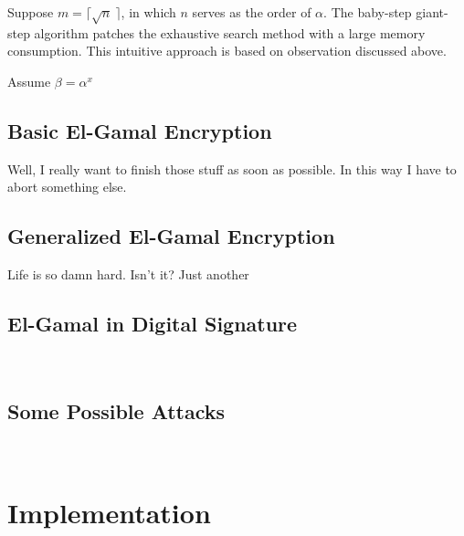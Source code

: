 \documentclass[12pt,journal,compsoc]{IEEEtran}
\begin{document}
Suppose $m=\lceil \sqrt{n}~\rceil$, in which $n$ serves as the order
of $\alpha$. The baby-step giant-step algorithm patches the exhaustive
search method with a large memory consumption. This intuitive approach
is based on observation discussed above.
\par
Assume $\beta=\alpha^{x}$











\subsection{Basic El-Gamal Encryption}
Well, I really want to finish those stuff as soon as possible. In this
way I have to abort something else.

\subsection{Generalized El-Gamal Encryption}
Life is so damn hard. Isn't it? Just another 

\subsection{El-Gamal in Digital Signature}
~

\subsection{Some Possible Attacks}
~





\section{Implementation}
\label{sec:implementation}
\end{document}
